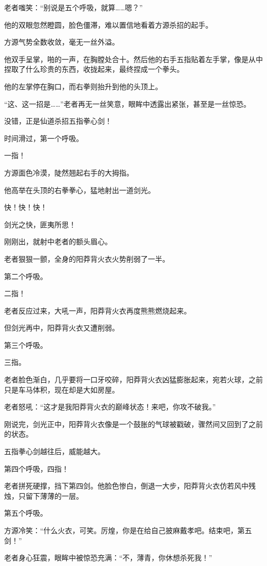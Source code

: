 \begin{this_body}
老者嗤笑：“别说是五个呼吸，就算……嗯？”

他的双眼忽然瞪圆，脸色僵滞，难以置信地看着方源杀招的起手。

方源气势全数收敛，毫无一丝外溢。

他双手呈掌，啪的一声，在胸膛处合十。然后他的右手五指贴着左手掌，像是从中捏取了什么珍贵的东西，收拢起来，最终捏成一个拳头。

他的左掌停在胸口，而右拳则抬升到他的头顶上。

“这、这一招是……”老者再无一丝笑意，眼眸中透露出紧张，甚至是一丝惊恐。

没错，正是仙道杀招五指拳心剑！

时间滑过，第一个呼吸。

一指！

方源面色冷漠，陡然翘起右手的大拇指。

他高举在头顶的右拳拳心，猛地射出一道剑光。

快！快！快！

剑光之快，匪夷所思！

刚刚出，就射中老者的额头眉心。

老者狠狠一颤，全身的阳莽背火衣火势削弱了一半。

第二个呼吸。

二指！

老者反应过来，大吼一声，阳莽背火衣再度熊熊燃烧起来。

但剑光再中，阳莽背火衣又遭削弱。

第三个呼吸。

三指。

老者脸色渐白，几乎要将一口牙咬碎，阳莽背火衣凶猛膨胀起来，宛若火球，之前只是车马体积，现在却是大如房屋。

老者怒吼：“这才是我阳莽背火衣的巅峰状态！来吧，你攻不破我。”

刚说完，剑光正中，阳莽背火衣像是一个鼓胀的气球被戳破，骤然间又回到了之前的状态。

五指拳心剑越往后，威能越大。

第四个呼吸，四指！

老者拼死硬撑，挡下第四剑。他脸色惨白，倒退一大步，阳莽背火衣仿若风中残烛，只留下薄薄的一层。

第五个呼吸。

方源冷笑：“什么火衣，可笑。厉煌，你是在给自己披麻戴孝吧。结束吧，第五剑！”

老者身心狂震，眼眸中被惊恐充满：“不，薄青，你休想杀死我！”


\end{this_body}
